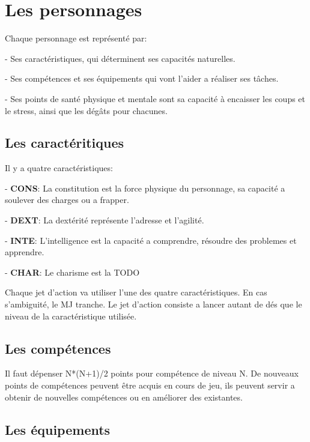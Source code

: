 ﻿
\section{Les personnages} 

Chaque personnage est représenté par:

- Ses caractéristiques, qui déterminent ses capacités naturelles.

- Ses compétences et ses équipements qui vont l'aider a réaliser ses tâches.

- Ses points de santé physique et mentale sont sa capacité à encaisser les coups et le stress, ainsi que les dégâts pour chacunes.


\subsection{Les caractéritiques}

Il y a quatre caractéristiques:

- \textbf{CONS}: La constitution est la force physique du personnage, sa capacité a soulever des charges ou a frapper.

- \textbf{DEXT}: La dextérité représente l'adresse et l'agilité.

- \textbf{INTE}: L’intelligence est la capacité a comprendre, résoudre des problemes et apprendre.

- \textbf{CHAR}: Le charisme est la TODO

Chaque jet d'action va utiliser l'une des quatre caractéristiques. En cas s'ambiguité, le MJ tranche. Le jet d'action consiste a lancer autant de dés que le niveau de la caractéristique utilisée.
	

\subsection{Les compétences}

Il faut dépenser N*(N+1)/2 points pour compétence de niveau N. De nouveaux points de compétences peuvent être acquis en cours de jeu, ils peuvent servir a obtenir de nouvelles compétences ou en améliorer des existantes.


\subsection{Les équipements}


